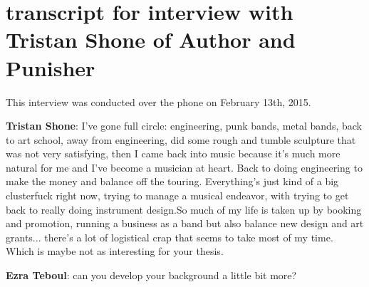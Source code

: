 \section{transcript for interview with Tristan Shone of Author and Punisher}

This interview was conducted over the phone on February 13th, 2015. 

\textbf{Tristan Shone}: I've gone full circle: engineering, punk bands, metal bands, back to art school, away from engineering, did some rough and tumble sculpture that was not very satisfying, then I came back into music because it's much more natural for me and I've become a musician at heart. Back to doing engineering to make the money and balance off the touring. Everything's just kind of a big clusterfuck right now, trying to manage a musical endeavor, with trying to get back to really doing instrument design.So much of my life is taken up by booking and promotion, running a business as a band but also balance new design and art grants... there's a lot of logistical crap that seems to take most of my time. Which is maybe not as interesting for your thesis. 

\textbf{Ezra Teboul}: can you develop your background a little bit more?

